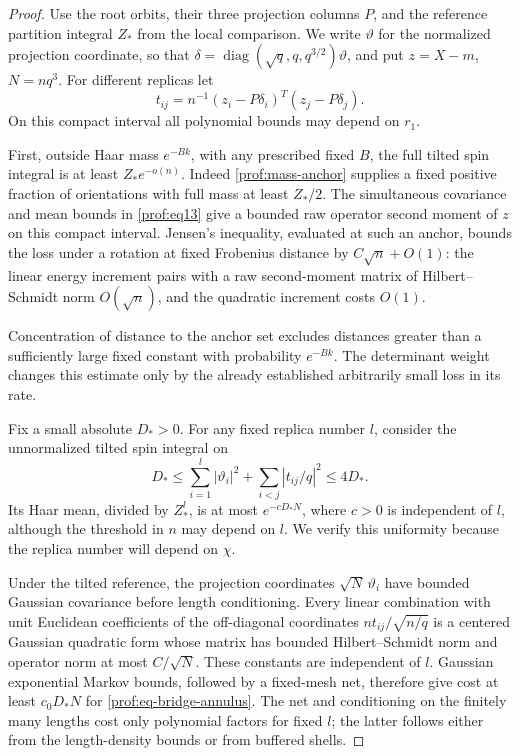 \begin{proof}
Use the root orbits, their three projection columns \(P\), and the reference
partition integral \(Z_*\) from the local comparison.  We write
\(\vartheta\) for the normalized projection coordinate, so that
\(\delta=\operatorname{diag}(\sqrt q,q,q^{3/2})\vartheta\), and put
\(z=X-m\), \(N=nq^3\).  For different replicas let
\[
 t_{ij}=n^{-1}(z_i-P\delta_i)^T(z_j-P\delta_j).
\]
On this compact interval all polynomial bounds may depend on \(r_1\).

First, outside Haar mass \(e^{-Bk}\), with any prescribed fixed \(B\),
the full tilted spin integral is at least \(Z_*e^{-o(n)}\).
Indeed \eqref{prof:mass-anchor} supplies a fixed positive fraction of
orientations with full mass at least \(Z_*/2\). The simultaneous
covariance and mean bounds in \eqref{prof:eq13} give a bounded raw
operator second moment of \(z\) on this compact interval.
Jensen's inequality, evaluated at such an anchor, bounds the
loss under a rotation at fixed Frobenius distance by
\(C\sqrt n+O(1)\): the linear energy increment pairs with a raw
second-moment matrix of Hilbert--Schmidt norm \(O(\sqrt n)\), and the
quadratic increment costs \(O(1)\).

Concentration of distance to the anchor
set excludes distances greater than a sufficiently large fixed constant
with probability \(e^{-Bk}\).  The determinant weight changes this estimate
only by the already established arbitrarily small loss in its rate.

Fix a small absolute \(D_*>0\).  For any fixed replica number \(l\),
consider the unnormalized tilted spin integral on
\begin{equation}
 D_*\le \sum_{i=1}^l|\vartheta_i|^2
       +\sum_{i<j}|t_{ij}/q|^2\le4D_*.
 \label{prof:eq-bridge-annulus}
\end{equation}
Its Haar mean, divided by \(Z_*^l\), is at most
\(e^{-cD_*N}\), where \(c>0\) is independent of \(l\), although the
threshold in \(n\) may depend on \(l\).  We verify this uniformity because
the replica number will depend on \(\chi\).

Under the tilted reference, the projection coordinates
\(\sqrt N\,\vartheta_i\) have bounded Gaussian covariance before length
conditioning.  Every linear combination with unit Euclidean coefficients
of the off-diagonal coordinates \(nt_{ij}/\sqrt{n/q}\) is a centered
Gaussian quadratic form whose matrix has bounded Hilbert--Schmidt norm and
operator norm at most \(C/\sqrt N\).  These constants are independent of
\(l\).  Gaussian exponential Markov bounds, followed by a fixed-mesh net,
therefore give cost at least \(c_0D_*N\) for
\eqref{prof:eq-bridge-annulus}.  The net and conditioning on the finitely
many lengths cost only polynomial factors for fixed \(l\); the latter
follows either from the length-density bounds or from buffered shells.


\end{proof}
